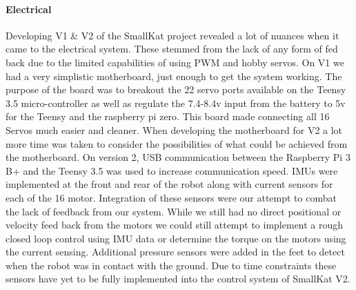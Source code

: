     \paragraph{Electrical}
    Developing V1 \& V2 of the SmallKat project revealed a lot of nuances when it came to the electrical system. These stemmed from the lack of any form of fed back due to the limited capabilities of using PWM and hobby servos. On V1 we had a very simplistic motherboard, just enough to get the system working. The purpose of the board was to breakout the 22 servo ports available on the Teensy 3.5 micro-controller as well as regulate the 7.4-8.4v input from the battery to 5v for the Teensy and the raspberry pi zero. This board made connecting all 16 Servos much easier and cleaner. When developing the motherboard for V2 a lot more time was taken to consider the possibilities of what could be achieved from the motherboard. On version 2, USB communication between the Raspberry Pi 3 B+ and the Teensy 3.5 was used to increase communication speed. IMUs were implemented at the front and rear of the robot along with current sensors for each of the 16 motor. Integration of these sensors were our attempt to combat the lack of feedback from our system. While we still had no direct positional or velocity feed back from the motors we could still attempt to implement a rough closed loop control using IMU data or determine the torque on the motors using the current sensing. Additional pressure sensors were added in the feet to detect when the robot was in contact with the ground. Due to time constraints these sensors have yet to be fully implemented into the control system of SmallKat V2.
